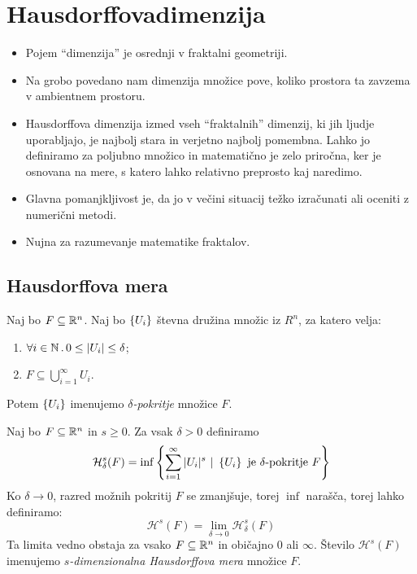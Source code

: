 \section{Hausdorffovadimenzija}
\begin{itemize}
    \item Pojem "`dimenzija"' je osrednji v fraktalni geometriji.
    \item Na grobo povedano nam dimenzija množice pove, koliko prostora ta zavzema v ambientnem prostoru.
    \item Hausdorffova dimenzija izmed vseh "`fraktalnih"' dimenzij, ki jih ljudje uporabljajo, je najbolj stara in verjetno najbolj pomembna. Lahko jo definiramo za poljubno množico in matematično je zelo priročna, ker je osnovana na mere, s katero lahko relativno preprosto kaj naredimo.
    \item Glavna pomanjkljivost je, da jo v večini situacij težko izračunati ali oceniti z numerični metodi.
    \item Nujna za razumevanje matematike fraktalov.
\end{itemize}

\subsection{Hausdorffova mera}
\begin{definicija}
    Naj bo \(F \subseteq \mathbb{R}^n\). Naj bo \(\left\{U_i\right\}\) števna družina množic iz \(R^n\), za katero velja:
    \begin{enumerate}
        \item \(\forall i \in \mathbb{N} \,.\, 0 \leq |U_i| \leq \delta\);
        \item \(F \subseteq \bigcup_{i=1}^\infty U_i\).
    \end{enumerate}
    Potem \(\left\{U_i\right\}\) imenujemo \emph{\(\delta\)-pokritje} množice \(F\).
\end{definicija}
%
Naj bo \(F \subseteq \mathbb{R}^n\) in \(s \geq 0\). Za vsak \(\delta > 0\) definiramo 
\[\mathcal{H}^s_\delta(F) = \inf \left\{\sum_{i=1}^{\infty}|U_i|^s \ | \ \left\{U_i\right\} \ \text{je \(\delta\)-pokritje \(F\)}\right\}\]
%
Ko \(\delta \to 0\), razred možnih pokritij \(F\) se zmanjšuje, torej \(\inf\) narašča, torej lahko definiramo:
\[\mathcal{H}^s(F) = \lim_{\delta \to 0} \mathcal{H}^s_\delta(F)\]
Ta limita vedno obstaja za vsako \(F \subseteq \mathbb{R}^n\) in običajno \(0\) ali \(\infty\). Število \(\mathcal{H}^s(F)\) imenujemo \emph{\(s\)-dimenzionalna Hausdorffova mera} množice \(F\).

